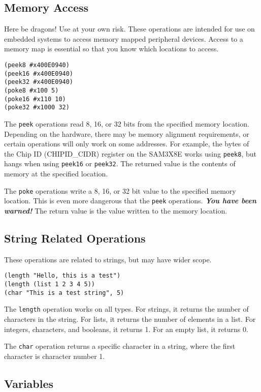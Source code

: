\documentclass[10pt, openany]{book}
\newcommand{\function}[1]{\texttt{#1}}
\begin{document}
\subsection{Memory Access}
Here be dragons!  Use at your own risk.  These operations are intended for use on embedded systems to access memory mapped peripheral devices.  Access to a memory map is essential so that you know which locations to access.
\begin{lstlisting}
(peek8 #x400E0940)
(peek16 #x400E0940)
(peek32 #x400E0940)
(poke8 #x100 5)
(poke16 #x110 10)
(poke32 #x1000 32)
\end{lstlisting}

The \function{peek} operations read 8, 16, or 32 bits from the specified memory location.  Depending on the hardware, there may be memory alignment requirements, or certain operations will only work on some addresses.  For example, the bytes of the Chip ID (CHIPID\_CIDR) register on the SAM3X8E works using \function{peek8}, but hangs when using \function{peek16} or \function{peek32}.  The returned value is the contents of memory at the specified location.

The \function{poke} operations write a 8, 16, or 32 bit value to the specified memory location.  This is even more dangerous that the \function{peek} operations.  \textbf{\textit{You have been warned!}}  The return value is the value written to the memory location.

\subsection{String Related Operations}
These operations are related to strings, but may have wider scope.
\begin{lstlisting}
(length "Hello, this is a test")
(length (list 1 2 3 4 5))
(char "This is a test string", 5)
\end{lstlisting}

The \function{length} operation works on all types.  For strings, it returns the number of characters in the string.  For lists, it returns the number of elements in a list.  For integers, characters, and booleans, it returns 1.  For an empty list, it returns 0.

The \function{char} operation returns a specific character in a string, where the first character is character number 1.

\subsection{Variables}
\end{document}
